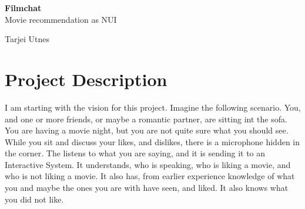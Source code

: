 \documentclass[11pt,fleqn]{book} %
\begin{document}

\begingroup
\thispagestyle{empty}
\centering
\vspace*{5cm}
\par\normalfont\fontsize{32}{32}\sffamily\selectfont
\textbf{Filmchat}\\
{\LARGE Movie recommendation as NUI}\par %
\vspace*{1cm}
{\Huge Tarjei Utnes}\par %
\endgroup



\pagestyle{empty} %

\tableofcontents %


\pagestyle{fancy} %



\chapter{Project Description}
I am starting with the vision for this project. Imagine the following scenario.
You, and one or more friends, or maybe a romantic partner, are sitting int the sofa. You are having a movie night, but you are not quite sure what you should see. While you sit and discuss your likes, and dislikes, there is a microphone hidden in the corner. The listens to what you are saying, and it is sending it to an Interactive System. It understands, who is speaking, who is liking a movie, and who is not liking a movie. It also has, from earlier experience knowledge of what you and maybe the ones you are with have seen, and liked. It also knows what you did not like.
\end{document}
